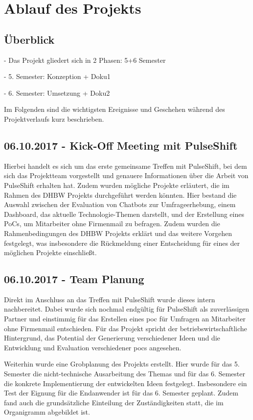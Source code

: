 \section{Ablauf des Projekts}

\subsection{Überblick}

- Das Projekt gliedert sich in 2 Phasen: 5+6 Semester

- 5. Semester: Konzeption + Doku1

- 6. Semester: Umsetzung  + Doku2

Im Folgenden sind die wichtigsten Ereignisse und Geschehen während des Projektverlaufs kurz beschrieben.

\subsection{06.10.2017 - Kick-Off Meeting mit PulseShift}
Hierbei handelt es sich um das erste gemeinsame Treffen mit PulseShift, bei dem sich das Projektteam vorgestellt und genauere Informationen über die Arbeit von PulseShift erhalten hat. Zudem wurden mögliche Projekte erläutert, die im Rahmen des DHBW Projekts durchgeführt werden könnten. Hier bestand die Auswahl zwischen der Evaluation von Chatbots zur Umfrageerhebung, einem Dashboard, das aktuelle Technologie-Themen darstellt, und der Erstellung eines PoCs, um Mitarbeiter ohne Firmenmail zu befragen. Zudem wurden die Rahmenbedingungen des DHBW Projekts erklärt und das weitere Vorgehen festgelegt, was insbesondere die Rückmeldung einer Entscheidung für eines der möglichen Projekte einschließt.

\subsection{06.10.2017 - Team Planung}
Direkt im Anschluss an das Treffen mit PulseShift wurde dieses intern nachbereitet. Dabei wurde sich nochmal endgültig für PulseShift als zuverlässigen Partner und einstimmig für das Erstellen eines \gls{poc} für Umfragen an Mitarbeiter ohne Firmenmail entschieden. Für das Projekt spricht der betriebswirtschaftliche Hintergrund, das Potential der Generierung verschiedener Ideen und die Entwicklung und Evaluation verschiedener \gls{poc}s angesehen.

Weiterhin wurde eine Grobplanung des Projekts erstellt. Hier wurde für das 5. Semester die nicht-technische Ausarbeitung des Themas und für das 6. Semester die konkrete Implementierung der entwickelten Ideen festgelegt. Insbesondere ein Test der Eignung für die Endanwender ist für das 6. Semester geplant. Zudem fand auch die grundsätzliche Einteilung der Zuständigkeiten statt, die im Organigramm abgebildet ist.

